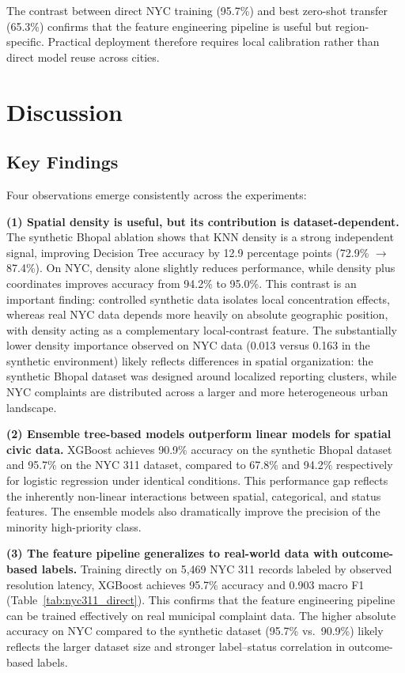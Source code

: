 \documentclass[12pt,onecolumn,draftclsnofoot]{IEEEtran}
\begin{document}
The contrast between direct NYC training (95.7\%) and best zero-shot transfer (65.3\%) confirms that the feature engineering pipeline is useful but region-specific. Practical deployment therefore requires local calibration rather than direct model reuse across cities.

\section{Discussion}

\subsection{Key Findings}

Four observations emerge consistently across the experiments:

\textbf{(1) Spatial density is useful, but its contribution is dataset-dependent.} The synthetic Bhopal ablation shows that KNN density is a strong independent signal, improving Decision Tree accuracy by 12.9 percentage points (72.9\% $\to$ 87.4\%). On NYC, density alone slightly reduces performance, while density plus coordinates improves accuracy from 94.2\% to 95.0\%. This contrast is an important finding: controlled synthetic data isolates local concentration effects, whereas real NYC data depends more heavily on absolute geographic position, with density acting as a complementary local-contrast feature. The substantially lower density importance observed on NYC data (0.013 versus 0.163 in the synthetic environment) likely reflects differences in spatial organization: the synthetic Bhopal dataset was designed around localized reporting clusters, while NYC complaints are distributed across a larger and more heterogeneous urban landscape.

\textbf{(2) Ensemble tree-based models outperform linear models for spatial civic data.} XGBoost achieves 90.9\% accuracy on the synthetic Bhopal dataset and 95.7\% on the NYC 311 dataset, compared to 67.8\% and 94.2\% respectively for logistic regression under identical conditions. This performance gap reflects the inherently non-linear interactions between spatial, categorical, and status features. The ensemble models also dramatically improve the precision of the minority high-priority class.

\textbf{(3) The feature pipeline generalizes to real-world data with outcome-based labels.} Training directly on 5,469 NYC 311 records labeled by observed resolution latency, XGBoost achieves 95.7\% accuracy and 0.903 macro F1 (Table~\ref{tab:nyc311_direct}). This confirms that the feature engineering pipeline can be trained effectively on real municipal complaint data. The higher absolute accuracy on NYC compared to the synthetic dataset (95.7\% vs.\ 90.9\%) likely reflects the larger dataset size and stronger label--status correlation in outcome-based labels.
\end{document}
